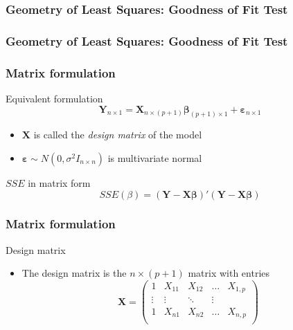 \documentclass[handout]{beamer}
\begin{document}

   \begin{frame} \frametitle{Geometry of Least Squares: Goodness of Fit Test}

   \end{frame}


   \begin{frame} \frametitle{Geometry of Least Squares: Goodness of Fit Test}

   \end{frame}


   \begin{frame} \frametitle{Matrix formulation}

   \begin{block}
   {Equivalent formulation}
   $${\pmb Y}_{n \times 1} = \pmb{X}_{n \times (p + 1)} \pmb{\beta}_{(p+1) \times 1} + \pmb{\varepsilon}_{n \times 1}$$
   \begin{itemize}

   \item $\pmb{X}$ is called the {\em design matrix} of the model
   \item $\pmb{\varepsilon} \sim N(0, \sigma^2 I_{n \times n})$ is multivariate normal
   \end{itemize}
   \end{block}
   \begin{block}
   {$SSE$ in matrix form}
   $$
   SSE(\beta) = (\pmb{Y} - \pmb{X} \pmb{\beta})'(\pmb{Y} - \pmb{X} \pmb{\beta})
   $$

   \end{block}
   \end{frame}


   \begin{frame} \frametitle{Matrix formulation}

   \begin{block}
   {Design matrix}
   \begin{itemize}
   \item The design matrix is the
   $n \times (p+1)$ matrix with entries
   $$
   \pmb{X} =
   \begin{pmatrix}
   1 & X_{11} & X_{12} & \dots & X_{1,p} \\
   \vdots &   \vdots & \ddots & \vdots \\
   1 & X_{n1} & X_{n2} &\dots & X_{n,p} \\
   \end{pmatrix}
   $$
   \end{itemize}
   \end{block}
   \end{frame}
\end{document}
